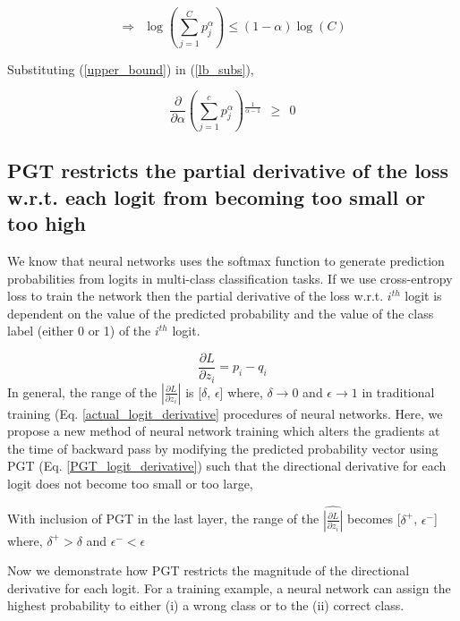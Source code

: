 \documentclass[runningheads]{llncs}
\begin{document}
\begin{equation}\Rightarrow\ \ \log \left(\sum _{j=1}^C p_j^{\alpha}\right)\leq
(1-\alpha ) \log (C) \label{upper_bound} \end{equation}

Substituting (\ref{upper_bound}) in (\ref{lb_subs}),

\begin{equation} \frac{\partial}{\partial \alpha
}\left(\sum _{j=1}^c p_j^{\alpha}\right){}^{\frac{1}{\alpha -1}}\ \ \geq \ \ 0
\end{equation}

\subsection{PGT restricts the partial derivative of the loss w.r.t. each logit from becoming too small or too high}
\label{sec:pgt_logit_derivative}

We know that neural networks uses the softmax function to generate prediction
probabilities from logits in multi-class classification tasks. If we use cross-entropy
loss to train the network then the partial derivative of the loss w.r.t. $i^{th}$ logit
is dependent on the value of the predicted probability and the value of the class label
(either 0 or 1) of the $i^{th}$ logit. 

\begin{equation}
\label{actual_logit_derivative}
\frac{\partial L}{\partial z_i} = p_i -q_i
\end{equation}
In general, the range of the $|\frac{\partial L}{\partial z_i}|$ is [$\delta$,
$\epsilon$] where, $\delta\rightarrow 0$ and $\epsilon\rightarrow 1$ in traditional
training (Eq. \ref{actual_logit_derivative} procedures of neural networks. Here, we
propose a new method of neural network training which alters the gradients at the time
of backward pass by modifying the predicted probability vector using PGT (Eq.
\ref{PGT_logit_derivative}) such that the directional derivative for each logit does not
become too small or too large,


With inclusion of PGT in the last layer, the range of the $\widehat{|\frac{\partial
L}{\partial z_i}|}$ becomes [$\delta^+$, $\epsilon^-$] where, $\delta^+>\delta$ and
$\epsilon^-<\epsilon$


Now we demonstrate how PGT restricts the magnitude of the directional derivative for
each logit. For a training example, a neural network can assign the highest probability
to either (i) a wrong class or to the (ii) correct class. 
\end{document}
